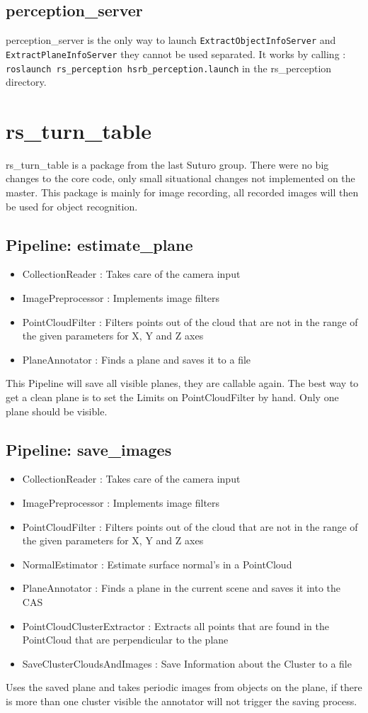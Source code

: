 \documentclass[main.tex]{subfiles}
\begin{document}
			\subsection{perception\_server}
perception\_server is the only way to launch \texttt{ExtractObjectInfoServer} and \texttt{ExtractPlaneInfoServer} they cannot be used separated. 
It works by calling :\texttt{ roslaunch rs\_perception hsrb\_perception.launch} in the rs\_perception directory.

		\section{rs\_turn\_table}
rs\_turn\_table is a package from the last Suturo group. There were no big changes to the core code, only small situational changes not implemented on the master. 
This package is mainly for image recording, all recorded images will then be used for object recognition.  
			\subsection{Pipeline: estimate\_plane}
\begin{itemize}
	\item CollectionReader : Takes care of the camera input
	\item ImagePreprocessor : Implements image filters  
	\item PointCloudFilter : Filters points out of the cloud that are not in the range of the given parameters for X, Y and Z axes
	\item PlaneAnnotator : Finds a plane and saves it to a file 
\end{itemize}
This Pipeline will save all visible planes, they are callable again. The best way to get a clean plane is to set the Limits on PointCloudFilter by hand. Only one plane should be visible. 

			\subsection{Pipeline: save\_images}
\begin{itemize}
	\item CollectionReader : Takes care of the camera input
	\item ImagePreprocessor : Implements image filters  
	\item PointCloudFilter : Filters points out of the cloud that are not in the range of the given parameters for X, Y and Z axes
	\item NormalEstimator : Estimate surface normal's in a PointCloud 
	\item PlaneAnnotator : Finds a plane in the current scene and saves it into the CAS
	\item PointCloudClusterExtractor : Extracts all points that are found in the PointCloud that are perpendicular to the plane 
	\item SaveClusterCloudsAndImages : Save Information about the Cluster to a file 
\end{itemize}
Uses the saved plane and takes periodic images from objects on the plane, if there is more than one cluster visible the annotator will not trigger the saving process.
\end{document}
